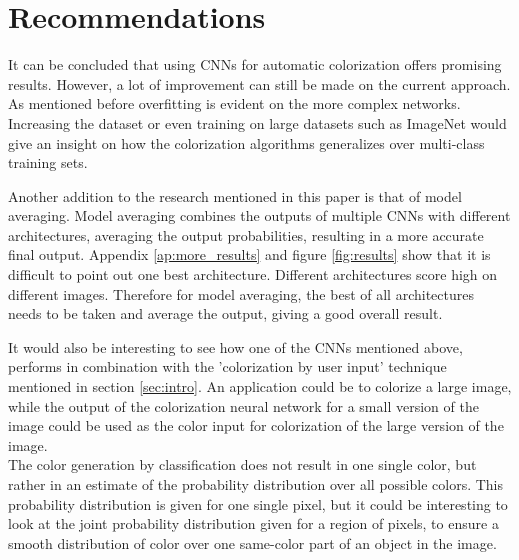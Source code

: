 \section{Recommendations}



It can be concluded that using CNNs for automatic colorization offers promising results. However, a lot of improvement can still be made on the current approach. As mentioned before overfitting is evident on the more complex networks. Increasing the dataset or even training on large datasets such as ImageNet \cite{deng2009imagenet} would give an insight on how the colorization algorithms generalizes over multi-class training sets. 

Another addition to the research mentioned in this paper is that of model averaging. Model averaging combines the outputs of multiple CNNs with different architectures, averaging the output probabilities, resulting in a more accurate final output. Appendix \ref{ap:more_results} and figure \ref{fig:results} show that it is difficult to point out one best architecture. Different architectures score high on different images. Therefore for model averaging, the best of all architectures needs to be taken and average the output, giving a good overall result.

It would also be interesting to see how one of the CNNs mentioned above, performs in combination with the 'colorization by user input' technique mentioned in section \ref{sec:intro}. An application could be to colorize a large image, while the output of the colorization neural network for a small version of the image could be used as the color input for colorization of the large version of the image.\\

The color generation by classification does not result in one single color, but rather in an estimate of the probability distribution over all possible colors. This probability distribution is given for one single pixel, but it could be interesting to look at the joint probability distribution given for a region of pixels, to ensure a smooth distribution of color over one same-color part of an object in the image.

